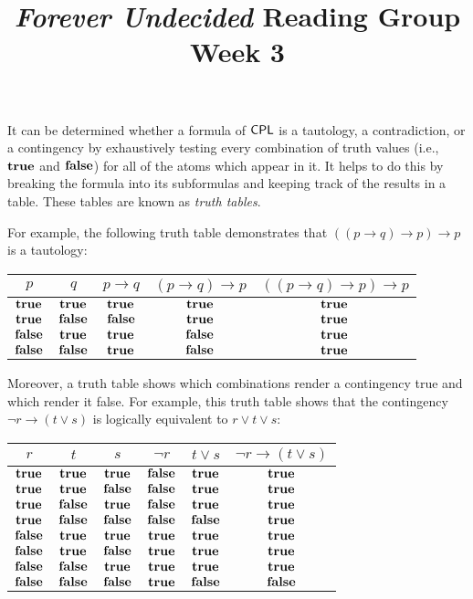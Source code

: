 \documentclass{article}
\title{\emph{Forever Undecided} Reading Group \\ Week 3}
\date{}
\author{}
\begin{document}
\maketitle

It can be determined whether a formula of $\mathsf{CPL}$ is a tautology, a contradiction, or a contingency by exhaustively testing every combination of truth values (i.e., $\mathbf{true}$ and $\mathbf{false}$) for all of the atoms which appear in it. It helps to do this by breaking the formula into its subformulas and keeping track of the results in a table. These tables are known as \emph{truth tables}.

For example, the following truth table demonstrates that $((p \to q) \to p) \to p$ is a tautology:

\begin{center}
\begin{tabular}{c|c||c|c|c}
    $p$ & $q$ & $p \to q$ & $(p \to q) \to p$ & $((p \to q) \to p) \to p$ \\
    \hline
    $\mathbf{true}$  & $\mathbf{true}$  & $\mathbf{true}$  & $\mathbf{true}$  & $\mathbf{true}$ \\
    $\mathbf{true}$  & $\mathbf{false}$ & $\mathbf{false}$ & $\mathbf{true}$  & $\mathbf{true}$ \\
    $\mathbf{false}$ & $\mathbf{true}$  & $\mathbf{true}$  & $\mathbf{false}$ & $\mathbf{true}$ \\
    $\mathbf{false}$ & $\mathbf{false}$ & $\mathbf{true}$  & $\mathbf{false}$ & $\mathbf{true}$ \\
\end{tabular}
\end{center}

Moreover, a truth table shows which combinations render a contingency true and which render it false. For example, this truth table shows that the contingency $\neg r \to (t \vee s)$ is logically equivalent to $r \vee t \vee s$:

\begin{center}
\begin{tabular}{c|c|c||c|c|c}
    $r$ & $t$ & $s$ & $\neg r$ & $t \vee s$ & $\neg r \to (t \vee s)$ \\
    \hline
    $\mathbf{true}$  & $\mathbf{true}$  & $\mathbf{true}$  & $\mathbf{false}$ & $\mathbf{true}$  & $\mathbf{true}$  \\
    $\mathbf{true}$  & $\mathbf{true}$  & $\mathbf{false}$ & $\mathbf{false}$ & $\mathbf{true}$  & $\mathbf{true}$  \\
    $\mathbf{true}$  & $\mathbf{false}$ & $\mathbf{true}$  & $\mathbf{false}$ & $\mathbf{true}$  & $\mathbf{true}$  \\
    $\mathbf{true}$  & $\mathbf{false}$ & $\mathbf{false}$ & $\mathbf{false}$ & $\mathbf{false}$ & $\mathbf{true}$  \\
    $\mathbf{false}$ & $\mathbf{true}$  & $\mathbf{true}$  & $\mathbf{true}$  & $\mathbf{true}$  & $\mathbf{true}$  \\
    $\mathbf{false}$ & $\mathbf{true}$  & $\mathbf{false}$ & $\mathbf{true}$  & $\mathbf{true}$  & $\mathbf{true}$  \\
    $\mathbf{false}$ & $\mathbf{false}$ & $\mathbf{true}$  & $\mathbf{true}$  & $\mathbf{true}$  & $\mathbf{true}$  \\
    $\mathbf{false}$ & $\mathbf{false}$ & $\mathbf{false}$ & $\mathbf{true}$  & $\mathbf{false}$ & $\mathbf{false}$ \\
\end{tabular}
\end{center}
\end{document}
